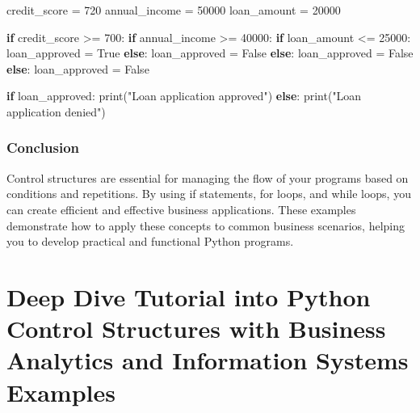 \documentclass[
  letterpaper,
  DIV=11,
  numbers=noendperiod]{scrreprt}
\newenvironment{Shaded}{\begin{snugshade}}{\end{snugshade}}
\newcommand{\BuiltInTok}[1]{\textcolor[rgb]{0.00,0.23,0.31}{#1}}
\newcommand{\ControlFlowTok}[1]{\textcolor[rgb]{0.00,0.23,0.31}{\textbf{#1}}}
\newcommand{\DecValTok}[1]{\textcolor[rgb]{0.68,0.00,0.00}{#1}}
\newcommand{\NormalTok}[1]{\textcolor[rgb]{0.00,0.23,0.31}{#1}}
\newcommand{\OperatorTok}[1]{\textcolor[rgb]{0.37,0.37,0.37}{#1}}
\newcommand{\StringTok}[1]{\textcolor[rgb]{0.13,0.47,0.30}{#1}}
\newcommand{\VariableTok}[1]{\textcolor[rgb]{0.07,0.07,0.07}{#1}}
\begin{document}
\begin{Shaded}
\begin{Highlighting}[]
\NormalTok{credit\_score }\OperatorTok{=} \DecValTok{720}
\NormalTok{annual\_income }\OperatorTok{=} \DecValTok{50000}
\NormalTok{loan\_amount }\OperatorTok{=} \DecValTok{20000}

\ControlFlowTok{if}\NormalTok{ credit\_score }\OperatorTok{\textgreater{}=} \DecValTok{700}\NormalTok{:}
    \ControlFlowTok{if}\NormalTok{ annual\_income }\OperatorTok{\textgreater{}=} \DecValTok{40000}\NormalTok{:}
        \ControlFlowTok{if}\NormalTok{ loan\_amount }\OperatorTok{\textless{}=} \DecValTok{25000}\NormalTok{:}
\NormalTok{            loan\_approved }\OperatorTok{=} \VariableTok{True}
        \ControlFlowTok{else}\NormalTok{:}
\NormalTok{            loan\_approved }\OperatorTok{=} \VariableTok{False}
    \ControlFlowTok{else}\NormalTok{:}
\NormalTok{        loan\_approved }\OperatorTok{=} \VariableTok{False}
\ControlFlowTok{else}\NormalTok{:}
\NormalTok{    loan\_approved }\OperatorTok{=} \VariableTok{False}

\ControlFlowTok{if}\NormalTok{ loan\_approved:}
    \BuiltInTok{print}\NormalTok{(}\StringTok{"Loan application approved"}\NormalTok{)}
\ControlFlowTok{else}\NormalTok{:}
    \BuiltInTok{print}\NormalTok{(}\StringTok{"Loan application denied"}\NormalTok{)}
\end{Highlighting}
\end{Shaded}

\subsection{Conclusion}\label{conclusion-2}

Control structures are essential for managing the flow of your programs
based on conditions and repetitions. By using if statements, for loops,
and while loops, you can create efficient and effective business
applications. These examples demonstrate how to apply these concepts to
common business scenarios, helping you to develop practical and
functional Python programs.


\chapter{Deep Dive Tutorial into Python Control Structures with Business
Analytics and Information Systems
Examples}\label{deep-dive-tutorial-into-python-control-structures-with-business-analytics-and-information-systems-examples}
\end{document}
